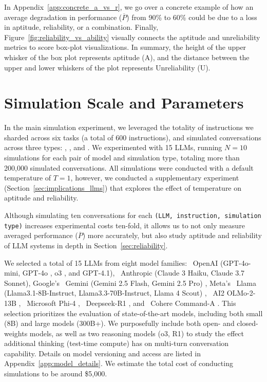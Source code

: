 \documentclass{article}
\begin{document}
In Appendix~\ref{app:concrete_a_vs_r}, we go over a concrete example of how an average degradation in performance ($\overline{P}$) from 90\% to 60\% could be due to a loss in aptitude, reliability, or a combination. Finally, Figure~\ref{fig:reliability_vs_ability} visually connects the aptitude and unreliability metrics to score box-plot visualizations. In summary, the height of the upper whisker of the box plot represents aptitude (A), and the distance between the upper and lower whiskers of the plot represents Unreliability (U).

\section{Simulation Scale and Parameters} \label{sec:scale_and_parameters}

In the main simulation experiment, we leveraged the totality of instructions we sharded across six tasks (a total of 600 instructions), and simulated conversations across three types: \full\hspace{0.1em} \fullt, \concat\hspace{0.1em} \concatt, and \sharded\hspace{0.1em} \shardedt. We experimented with 15 LLMs, running $N=10$ simulations for each pair of model and simulation type, totaling more than 200,000 simulated conversations. All simulations were conducted with a default temperature of $T=1$, however, we conducted a supplementary experiment (Section~\ref{sec:implications_llms}) that explores the effect of temperature on aptitude and reliability.

Although simulating ten conversations for each \texttt{(LLM, instruction, simulation type)} increases experimental costs ten-fold, it allows us to not only measure averaged performance ($\overline{P}$) more accurately, but also study aptitude and reliability of LLM systems in depth in Section~\ref{sec:reliability}.

We selected a total of 15 LLMs from eight model families: \openai~OpenAI (GPT-4o-mini, GPT-4o \cite{hurst2024gpt}, o3 \cite{openai2025o3}, and GPT-4.1), \claude~Anthropic (Claude 3 Haiku, Claude 3.7 Sonnet), Google's \gemini~Gemini (Gemini 2.5 Flash, Gemini 2.5 Pro) \cite{team2023gemini}, Meta's \llama~Llama (Llama3.1-8B-Instruct, Llama3.3-70B-Instruct, Llama 4 Scout) \cite{grattafiori2024llama}, \aitwo~AI2 OLMo-2-13B \cite{olmo20242}, \microsoft~Microsoft Phi-4 \cite{abdin2024phi}, \deepseek~Deepseek-R1 \cite{guo2025deepseek}, and \cohere~Cohere Command-A \cite{cohere2025command}. This selection prioritizes the evaluation of state-of-the-art models, including both small (8B) and large models (300B+). We purposefully include both open- and closed-weights models, as well as two reasoning models (o3, R1) to study the effect additional thinking (test-time compute) has on multi-turn conversation capability. Details on model versioning and access are listed in Appendix~\ref{app:model_details}. We estimate the total cost of conducting simulations to be around \$5,000.
\end{document}
